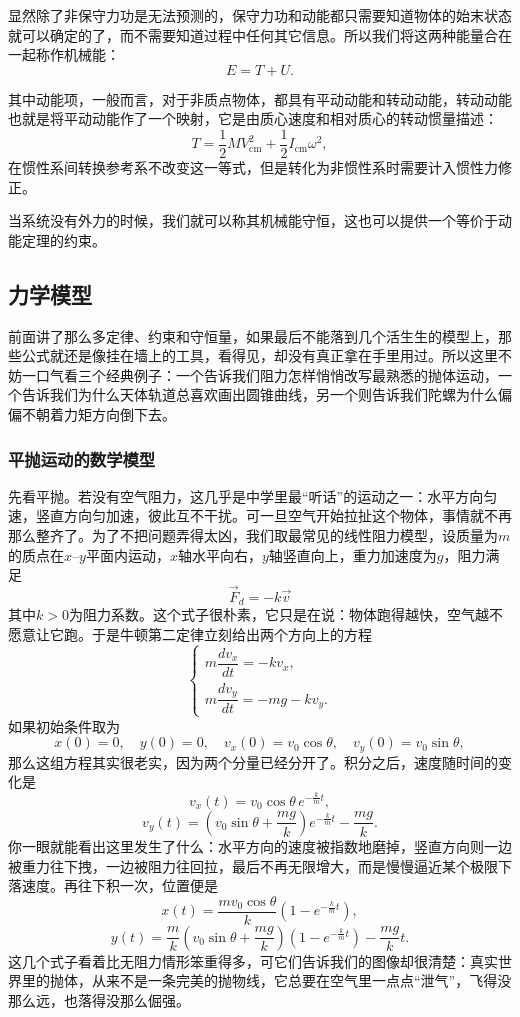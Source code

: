 \documentclass[UTF8]{ctexbook}
\begin{document}
显然除了非保守力功是无法预测的，保守力功和动能都只需要知道物体的始末状态就可以确定的了，而不需要知道过程中任何其它信息。所以我们将这两种能量合在一起称作机械能：
\[
E=T+U.
\]

其中动能项，一般而言，对于非质点物体，都具有平动动能和转动动能，转动动能也就是将平动动能作了一个映射，它是由质心速度和相对质心的转动惯量描述：
\[
T=\frac12 M V_{\mathrm{cm}}^2+\frac12 I_{\mathrm{cm}}\omega^2,
\]
在惯性系间转换参考系不改变这一等式，但是转化为非惯性系时需要计入惯性力修正。

当系统没有外力的时候，我们就可以称其机械能守恒，这也可以提供一个等价于动能定理的约束。

\subsection{力学模型}

前面讲了那么多定律、约束和守恒量，如果最后不能落到几个活生生的模型上，那些公式就还是像挂在墙上的工具，看得见，却没有真正拿在手里用过。所以这里不妨一口气看三个经典例子：一个告诉我们阻力怎样悄悄改写最熟悉的抛体运动，一个告诉我们为什么天体轨道总喜欢画出圆锥曲线，另一个则告诉我们陀螺为什么偏偏不朝着力矩方向倒下去。

\subsubsection{平抛运动的数学模型}

先看平抛。若没有空气阻力，这几乎是中学里最“听话”的运动之一：水平方向匀速，竖直方向匀加速，彼此互不干扰。可一旦空气开始拉扯这个物体，事情就不再那么整齐了。为了不把问题弄得太凶，我们取最常见的线性阻力模型，设质量为$m$的质点在$x$--$y$平面内运动，$x$轴水平向右，$y$轴竖直向上，重力加速度为$g$，阻力满足
\[
\vec{F}_d=-k\vec{v}
\]
其中$k>0$为阻力系数。这个式子很朴素，它只是在说：物体跑得越快，空气越不愿意让它跑。于是牛顿第二定律立刻给出两个方向上的方程
\[
\begin{cases}
m\dfrac{dv_x}{dt}=-k v_x,\\[4pt]
m\dfrac{dv_y}{dt}=-mg-k v_y.
\end{cases}
\]
如果初始条件取为
\[
x(0)=0,\quad y(0)=0,\quad v_x(0)=v_0\cos\theta,\quad v_y(0)=v_0\sin\theta,
\]
那么这组方程其实很老实，因为两个分量已经分开了。积分之后，速度随时间的变化是
\[
v_x(t)=v_0\cos\theta\,e^{-\frac{k}{m}t},
\]
\[
v_y(t)=\left(v_0\sin\theta+\frac{mg}{k}\right)e^{-\frac{k}{m}t}-\frac{mg}{k}.
\]
你一眼就能看出这里发生了什么：水平方向的速度被指数地磨掉，竖直方向则一边被重力往下拽，一边被阻力往回拉，最后不再无限增大，而是慢慢逼近某个极限下落速度。再往下积一次，位置便是
\[
x(t)=\frac{m v_0\cos\theta}{k}\left(1-e^{-\frac{k}{m}t}\right),
\]
\[
y(t)=\frac{m}{k}\left(v_0\sin\theta+\frac{mg}{k}\right)\left(1-e^{-\frac{k}{m}t}\right)-\frac{mg}{k}t.
\]
这几个式子看着比无阻力情形笨重得多，可它们告诉我们的图像却很清楚：真实世界里的抛体，从来不是一条完美的抛物线，它总要在空气里一点点“泄气”，飞得没那么远，也落得没那么倔强。
\end{document}
